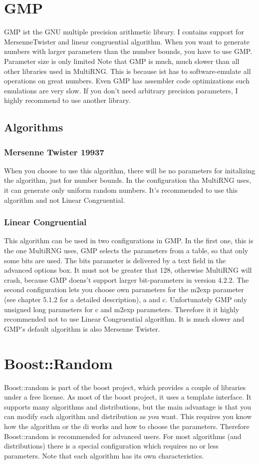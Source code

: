 \documentclass{scrartcl}
\begin{document}
\section{GMP}
GMP ist the GNU multiple precision arithmetic library. I contains support for MersenneTwister and linear congruential algorithm. When you want to generate numbers with larger parameters than the number bounds, you have to use GMP. Parameter size is only limited Note that GMP is much, much slower than all other libraries used in MultiRNG. This is because ist has to software-emulate all operations on great numbers. Even GMP has assembler code optimizations such emulations are very slow. If you don't need arbitrary precision parameters, I highly recommend to use another library.
\subsection{Algorithms}
\subsubsection{Mersenne Twister 19937}
When you choose to use this algorithm, there will be no parameters for initalizing the algorithm, just for number bounds. In the configuration tha MultiRNG uses, it can generate only uniform random numbers. It's recommended to use this algorithm and not Linear Congruential.
\subsubsection{Linear Congruential}
This algorithm can be used in two configurations in GMP. In the first one, this is the one MultiRNG uses, GMP selects the parameters from a table, so that only some bits are used. The bits parameter is delivered by a text field in the advanced options box. It must not be greater that 128, otherwise MultiRNG will crash, because GMP doens't support larger bit-parameters in version 4.2.2.\newline
The second configuration lets you choose own parameters for the m2exp parameter (see chapter 5.1.2 for a detailed description), a and c. Unfortunately GMP only unsigned long parameters for c and m2exp parameters. Therefore it it highly recommended not to use Linear Congruential algorithm. It is much slower and GMP's default algorithm is also Mersenne Twister.
\section{Boost::Random}
Boost::random is part of the boost project, which provides a couple of libraries under a free license. As most of the boost project, it uses a template interface. It supports many algorithms and distributions, but the main advantage is that you can modify each algorithm and distribution as you want. This requires you know how the algorithm or the di works and how to choose the parameters. Therefore Boost::random is recommended for advanced users. For most algorithms (and distributions) there is a special configuration which requires no or less parameters. Note that each algorithm has its own characteristics.
\end{document}
